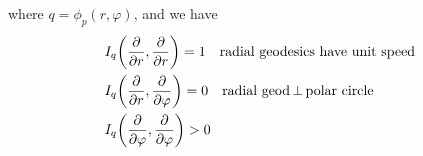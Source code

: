 \documentclass[10pt]{article}
\begin{document}
\begin{definition}
\begin{itemize}
\begin{equation*}
                    \end{equation*}
                    where $q = \phi_p(r,\varphi)$, and we have
                    \begin{equation*}
                        \begin{aligned}
                            &I_q\bigg(\frac{\partial}{\partial r}, \frac{\partial}{\partial r}\bigg) = 1 \quad\text{radial geodesics have unit speed} \\
                            &I_q\bigg(\frac{\partial}{\partial r}, \frac{\partial}{\partial\varphi}\bigg) = 0 \quad\text{radial geod}\thinspace\bot\thinspace\text{polar circle} \\
                            &I_q\bigg(\frac{\partial}{\partial\varphi}, \frac{\partial}{\partial\varphi}\bigg) > 0
                        \end{aligned}
                    \end{equation*}
                \end{itemize}
            \end{definition}
\end{document}
